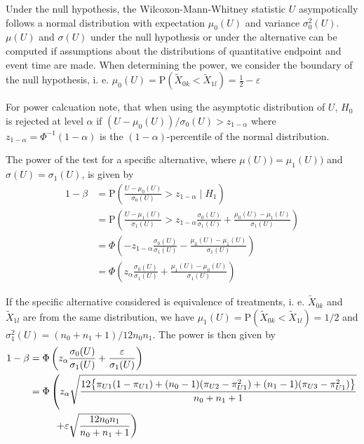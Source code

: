 \documentclass[bimj,fleqn]{w-art}\usepackage[]{graphicx}\usepackage[]{color}
\theoremstyle{plain}
\theoremstyle{definition}
\begin{document}
  Under the null hypothesis, the Wilcoxon-Mann-Whitney statistic $U$
  asympotically follows a normal distribution with expectation $\mu_0(U)$ and
  variance $\sigma^2_0(U)$. $\mu(U)$ and $\sigma(U)$ under the null hypothesis
  or under the alternative can be computed if assumptions about the
  distributions of quantitative endpoint and event time are made. When
  determining the power, we consider the boundary of the null hypothesis, i. e.
  $\mu_0(U) = \text{P}(\widetilde{X}_{0k} < \widetilde{X}_{1l})
          = \frac{1}{2} - \varepsilon$

  For power calcuation note, that when using the asymptotic distribution of $U$, $H_0$ is rejected at
  level $\alpha$ if $(U - \mu_0(U)) / \sigma_0(U) > z_{1 - \alpha}$ where
  $z_{1-\alpha} = \Phi^{-1}({1-\alpha})$ is the $(1 - \alpha)$-percentile of the
  normal distribution.

  The power of the test for a specific alternative, where $\mu(U)) = \mu_1(U))$
  and $\sigma(U) = \sigma_1(U)$, is given by
  \begin{align*}
    1 - \beta &= \text{P} \left(\frac{U - \mu_0(U)}{\sigma_0(U)}  >
                                   z_{1-\alpha} \mid H_1 \right) \\
              &= \text{P} \left(\frac{U - \mu_1(U)}{\sigma_1(U)}  >
                                   z_{1-\alpha}\frac{\sigma_0(U)}{\sigma_1(U)} +
                                   \frac{\mu_0(U) - \mu_1(U)}{\sigma_1(U)} \right) \\
              &= \Phi\left(- z_{1-\alpha}\frac{\sigma_0(U)}{\sigma_1(U)} -
                              \frac{\mu_0(U) - \mu_1(U)}{\sigma_1(U)} \right) \\
              &= \Phi\left(z_{\alpha}\frac{\sigma_0(U)}{\sigma_1(U)} +
                              \frac{\mu_1(U) - \mu_0(U)}{\sigma_1(U)} \right)
  \end{align*}

  If the specific alternative considered is equivalence of treatments, i. e.
  $\widetilde{X}_{0k}$ and $\widetilde{X}_{1l}$ are from the same distribution,
  we have $\mu_1(U) = \text{P}(\widetilde{X}_{0k} < \widetilde{X}_{1l}) = 1/2$
  and $\sigma^2_1(U) = (n_0 + n_1 +1) /12 n_0 n_1$. The power is
  then given by
  \begin{align*}
  1 - \beta &= \Phi\left(z_{\alpha}\frac{\sigma_0(U)}{\sigma_1(U)} +
                              \frac{\varepsilon}{\sigma_1(U)} \right) \\
            &= \Phi\left(z_{\alpha} \sqrt{\frac{12 \big\{ \pi_{U1} (1 - \pi_{U1}) +
                                    (n_0 - 1) (\pi_{U2} - \pi_{U1}^2) +
                                    (n_1 - 1) (\pi_{U3} - \pi_{U1}^2) \big\}}{n_0 + n_1 +1}} \right.\\
            &{\hphantom{= \Phi\bigg(}} \left. + \varepsilon \sqrt{\frac{12 n_0 n_1 }{n_0 + n_1 +1}} \right)
  \end{align*}
\end{document}
